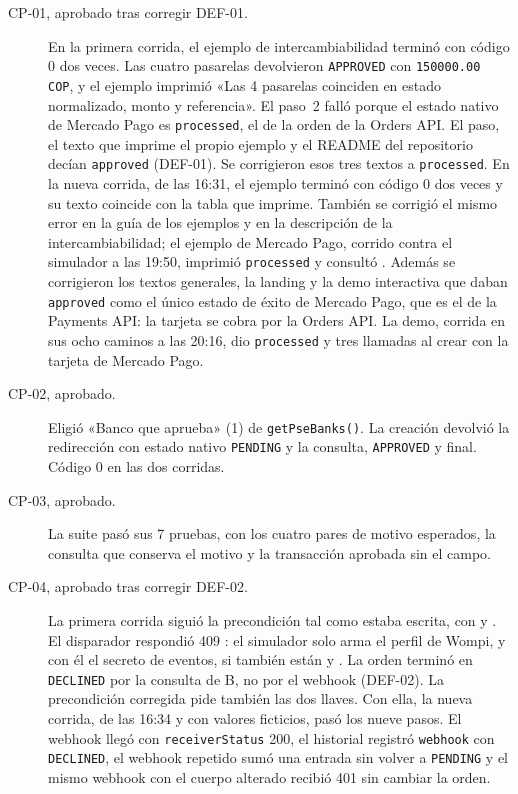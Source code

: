 \begin{description}
  \item[CP-01, aprobado tras corregir DEF-01.] En la primera corrida, el ejemplo de intercambiabilidad terminó con código 0 dos veces. Las cuatro pasarelas devolvieron \texttt{APPROVED} con \texttt{150000.00 COP}, y el ejemplo imprimió «Las 4 pasarelas coinciden en estado normalizado, monto y referencia». El paso~2 falló porque el estado nativo de Mercado Pago es \texttt{processed}, el de la orden de la Orders API. El paso, el texto que imprime el propio ejemplo y el README del repositorio decían \texttt{approved} (DEF-01). Se corrigieron esos tres textos a \texttt{processed}. En la nueva corrida, de las 16:31, el ejemplo terminó con código 0 dos veces y su texto coincide con la tabla que imprime. También se corrigió el mismo error en la guía de los ejemplos y en la descripción de la intercambiabilidad; el ejemplo de Mercado Pago, corrido contra el simulador a las 19:50, imprimió \texttt{processed} y consultó . Además se corrigieron los textos generales, la landing y la demo interactiva que daban \texttt{approved} como el único estado de éxito de Mercado Pago, que es el de la Payments API: la tarjeta se cobra por la Orders API. La demo, corrida en sus ocho caminos a las 20:16, dio \texttt{processed} y tres llamadas al crear con la tarjeta de Mercado Pago.
  \item[CP-02, aprobado.] Eligió «Banco que aprueba» (1) de \texttt{getPseBanks()}. La creación devolvió la redirección con estado nativo \texttt{PENDING} y la consulta, \texttt{APPROVED} y final. Código 0 en las dos corridas.
  \item[CP-03, aprobado.] La suite  pasó sus 7 pruebas, con los cuatro pares de motivo esperados, la consulta que conserva el motivo y la transacción aprobada sin el campo.
  \item[CP-04, aprobado tras corregir DEF-02.] La primera corrida siguió la precondición tal como estaba escrita, con  y . El disparador respondió 409 : el simulador solo arma el perfil de Wompi, y con él el secreto de eventos, si también están  y . La orden terminó en \texttt{DECLINED} por la consulta de B, no por el webhook (DEF-02). La precondición corregida pide también las dos llaves. Con ella, la nueva corrida, de las 16:34 y con valores ficticios, pasó los nueve pasos. El webhook llegó con \texttt{receiverStatus} 200, el historial registró \texttt{webhook} con \texttt{DECLINED}, el webhook repetido sumó una entrada sin volver a \texttt{PENDING} y el mismo webhook con el cuerpo alterado recibió 401 sin cambiar la orden.

\end{description}

